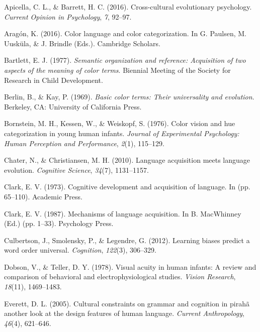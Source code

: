 \documentclass[
  english,
  ,man,floatsintext]{apa6}
\begin{document}
\hypertarget{refs}{}
\leavevmode\hypertarget{ref-apicella2016}{}%
Apicella, C. L., \& Barrett, H. C. (2016). Cross-cultural evolutionary psychology. \emph{Current Opinion in Psychology}, \emph{7}, 92--97.

\leavevmode\hypertarget{ref-aragon2016}{}%
Aragón, K. (2016). Color language and color categorization. In G. Paulsen, M. Uusküla, \& J. Brindle (Eds.). Cambridge Scholars.

\leavevmode\hypertarget{ref-bartlett1977}{}%
Bartlett, E. J. (1977). \emph{Semantic organization and reference: Acquisition of two aspects of the meaning of color terms}. Biennial Meeting of the Society for Research in Child Development.

\leavevmode\hypertarget{ref-berlin1969}{}%
Berlin, B., \& Kay, P. (1969). \emph{Basic color terms: Their universality and evolution}. Berkeley, CA: University of California Press.

\leavevmode\hypertarget{ref-bornstein1976}{}%
Bornstein, M. H., Kessen, W., \& Weiskopf, S. (1976). Color vision and hue categorization in young human infants. \emph{Journal of Experimental Psychology: Human Perception and Performance}, \emph{2}(1), 115--129.

\leavevmode\hypertarget{ref-chater2010}{}%
Chater, N., \& Christiansen, M. H. (2010). Language acquisition meets language evolution. \emph{Cognitive Science}, \emph{34}(7), 1131--1157.

\leavevmode\hypertarget{ref-clark1973}{}%
Clark, E. V. (1973). Cognitive development and acquisition of language. In (pp. 65--110). Academic Press.

\leavevmode\hypertarget{ref-clark1987}{}%
Clark, E. V. (1987). Mechanisms of language acquisition. In B. MacWhinney (Ed.) (pp. 1--33). Psychology Press.

\leavevmode\hypertarget{ref-culbertson2012}{}%
Culbertson, J., Smolensky, P., \& Legendre, G. (2012). Learning biases predict a word order universal. \emph{Cognition}, \emph{122}(3), 306--329.

\leavevmode\hypertarget{ref-dobson1978}{}%
Dobson, V., \& Teller, D. Y. (1978). Visual acuity in human infants: A review and comparison of behavioral and electrophysiological studies. \emph{Vision Research}, \emph{18}(11), 1469--1483.

\leavevmode\hypertarget{ref-everett2005}{}%
Everett, D. L. (2005). Cultural constraints on grammar and cognition in pirahã another look at the design features of human language. \emph{Current Anthropology}, \emph{46}(4), 621--646.
\end{document}
